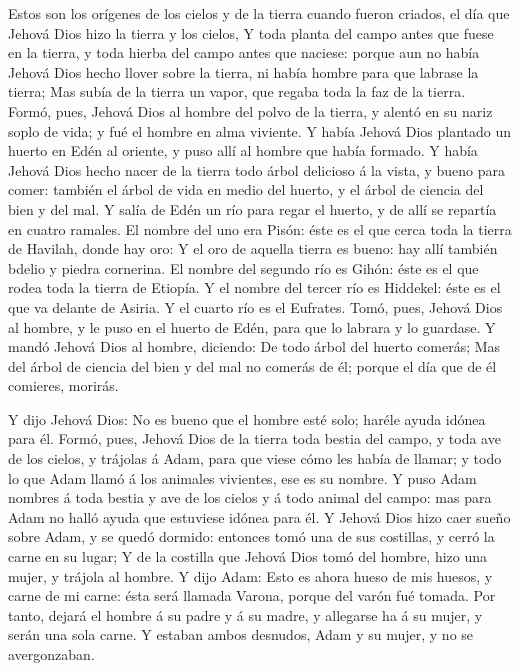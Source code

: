  Estos son los orígenes de los cielos y de la tierra cuando
fueron criados, el día que Jehová Dios hizo la tierra y los cielos,
 Y toda planta del campo antes que fuese en la tierra, y
toda hierba del campo antes que naciese: porque aun no había Jehová Dios
hecho llover sobre la tierra, ni había hombre para que labrase la
tierra;  Mas subía de la tierra un vapor, que regaba toda la
faz de la tierra.  Formó, pues, Jehová Dios al hombre del
polvo de la tierra, y alentó en su nariz soplo de vida; y fué el hombre
en alma viviente.  Y había Jehová Dios plantado un huerto en
Edén al oriente, y puso allí al hombre que había formado.  Y
había Jehová Dios hecho nacer de la tierra todo árbol delicioso á la
vista, y bueno para comer: también el árbol de vida en medio del huerto,
y el árbol de ciencia del bien y del mal.  Y salía de Edén
un río para regar el huerto, y de allí se repartía en cuatro ramales.
 El nombre del uno era Pisón: éste es el que cerca toda la
tierra de Havilah, donde hay oro:  Y el oro de aquella
tierra es bueno: hay allí también bdelio y piedra cornerina.
 El nombre del segundo río es Gihón: éste es el que rodea
toda la tierra de Etiopía.  Y el nombre del tercer río es
Hiddekel: éste es el que va delante de Asiria. Y el cuarto río es el
Eufrates.  Tomó, pues, Jehová Dios al hombre, y le puso en
el huerto de Edén, para que lo labrara y lo guardase.  Y
mandó Jehová Dios al hombre, diciendo: De todo árbol del huerto comerás;
 Mas del árbol de ciencia del bien y del mal no comerás de
él; porque el día que de él comieres, morirás.

 Y dijo Jehová Dios: No es bueno que el hombre esté solo;
haréle ayuda idónea para él.  Formó, pues, Jehová Dios de
la tierra toda bestia del campo, y toda ave de los cielos, y trájolas á
Adam, para que viese cómo les había de llamar; y todo lo que Adam llamó
á los animales vivientes, ese es su nombre.  Y puso Adam
nombres á toda bestia y ave de los cielos y á todo animal del campo: mas
para Adam no halló ayuda que estuviese idónea para él.  Y
Jehová Dios hizo caer sueño sobre Adam, y se quedó dormido: entonces
tomó una de sus costillas, y cerró la carne en su lugar;  Y
de la costilla que Jehová Dios tomó del hombre, hizo una mujer, y
trájola al hombre.  Y dijo Adam: Esto es ahora hueso de mis
huesos, y carne de mi carne: ésta será llamada Varona, porque del varón
fué tomada.  Por tanto, dejará el hombre á su padre y á su
madre, y allegarse ha á su mujer, y serán una sola carne. 
Y estaban ambos desnudos, Adam y su mujer, y no se avergonzaban.

